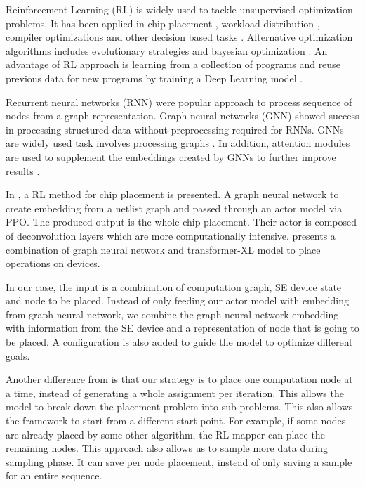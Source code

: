 Reinforcement Learning (RL) is widely used to tackle unsupervised optimization problems. It has been applied in chip placement \cite{mirhoseini2020chip}, 
workload distribution \cite{Mirhoseini_placementRNN, addanki2019placeto, zhou2019gdp}, compiler optimizations \cite{Zhou_compileGNN} and 
other decision based tasks \cite{kormushev2013reinforcement, ZophL16_NASRL}. Alternative optimization algorithms includes 
evolutionary strategies \cite{Zhichao_ESNAS} and bayesian optimization \cite{shi2020learned}. An advantage of RL approach is learning from 
a collection of programs and reuse previous data for new programs by training a Deep Learning model \cite{zhou2019gdp}.

Recurrent neural networks (RNN) \cite{hochreiter1996lstm} were popular approach to process sequence of nodes from a graph representation. 
Graph neural networks (GNN) \cite{gori2005new} showed success in processing structured data without preprocessing required for RNNs.
GNNs are widely used task involves processing graphs \cite{Zhou_compileGNN, zhou2019gdp}. In addition, attention modules are used to 
supplement the embeddings created by GNNs to further improve results \cite{addanki2019placeto}.

In \cite{mirhoseini2020chip}, a RL method for chip placement is presented. A graph neural network to create embedding from a netlist graph and passed through an actor model via PPO. 
The produced output is the whole chip placement. Their actor is composed of deconvolution layers which are more computationally intensive. 
\cite{zhou2019gdp} presents a combination of graph neural network and transformer-XL model to place operations on devices. 

In our case, the input is a combination of computation graph, SE device state and node to be placed. 
Instead of only feeding our actor model with embedding from graph neural network, we combine the graph neural network embedding with information from the SE device and a representation of node that is going to be placed. 
A configuration is also added to guide the model to optimize different goals.  

Another difference from \cite{zhou2019gdp}  is that our strategy is to place one computation node at a time, instead of generating a whole assignment per iteration. 
This allows the model to break down the placement problem into sub-problems. 
This also allows the framework to start from a different start point. For example, if some nodes are already placed by some other algorithm, the RL mapper can place the remaining nodes. 
This approach also allows us to sample more data during sampling phase. 
It can save per node placement, instead of only saving a sample for an entire sequence.  